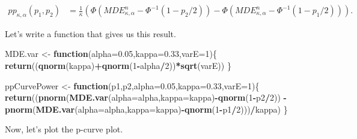 \documentclass[]{book}
\newenvironment{Shaded}{\begin{snugshade}}{\end{snugshade}}
\newcommand{\ControlFlowTok}[1]{\textcolor[rgb]{0.13,0.29,0.53}{\textbf{#1}}}
\newcommand{\DataTypeTok}[1]{\textcolor[rgb]{0.13,0.29,0.53}{#1}}
\newcommand{\DecValTok}[1]{\textcolor[rgb]{0.00,0.00,0.81}{#1}}
\newcommand{\FloatTok}[1]{\textcolor[rgb]{0.00,0.00,0.81}{#1}}
\newcommand{\KeywordTok}[1]{\textcolor[rgb]{0.13,0.29,0.53}{\textbf{#1}}}
\newcommand{\NormalTok}[1]{#1}
\newcommand{\OperatorTok}[1]{\textcolor[rgb]{0.81,0.36,0.00}{\textbf{#1}}}
\newcommand{\StringTok}[1]{\textcolor[rgb]{0.31,0.60,0.02}{#1}}
\theoremstyle{definition}
\theoremstyle{definition}
\theoremstyle{definition}
\theoremstyle{remark}
\begin{document}
\begin{align*}
  pp_{\kappa,\alpha}(p_1,p_2) & = \frac{1}{\kappa}\left(\Phi(MDE^n_{\kappa,\alpha}-\Phi^{-1}(1-p_2/2))-\Phi(MDE^n_{\kappa,\alpha}-\Phi^{-1}(1-p_1/2))\right).
\end{align*}

Let's write a function that gives us this result.

\begin{Shaded}
\begin{Highlighting}[]
\NormalTok{MDE.var <-}\StringTok{ }\ControlFlowTok{function}\NormalTok{(}\DataTypeTok{alpha=}\FloatTok{0.05}\NormalTok{,}\DataTypeTok{kappa=}\FloatTok{0.33}\NormalTok{,}\DataTypeTok{varE=}\DecValTok{1}\NormalTok{)\{}
  \KeywordTok{return}\NormalTok{((}\KeywordTok{qnorm}\NormalTok{(kappa)}\OperatorTok{+}\KeywordTok{qnorm}\NormalTok{(}\DecValTok{1}\OperatorTok{-}\NormalTok{alpha}\OperatorTok{/}\DecValTok{2}\NormalTok{))}\OperatorTok{*}\KeywordTok{sqrt}\NormalTok{(varE))}
\NormalTok{\}}

\NormalTok{ppCurvePower <-}\StringTok{ }\ControlFlowTok{function}\NormalTok{(p1,p2,}\DataTypeTok{alpha=}\FloatTok{0.05}\NormalTok{,}\DataTypeTok{kappa=}\FloatTok{0.33}\NormalTok{,}\DataTypeTok{varE=}\DecValTok{1}\NormalTok{)\{}
  \KeywordTok{return}\NormalTok{((}\KeywordTok{pnorm}\NormalTok{(}\KeywordTok{MDE.var}\NormalTok{(}\DataTypeTok{alpha=}\NormalTok{alpha,}\DataTypeTok{kappa=}\NormalTok{kappa)}\OperatorTok{-}\KeywordTok{qnorm}\NormalTok{(}\DecValTok{1}\OperatorTok{-}\NormalTok{p2}\OperatorTok{/}\DecValTok{2}\NormalTok{))}
          \OperatorTok{-}\KeywordTok{pnorm}\NormalTok{(}\KeywordTok{MDE.var}\NormalTok{(}\DataTypeTok{alpha=}\NormalTok{alpha,}\DataTypeTok{kappa=}\NormalTok{kappa)}\OperatorTok{-}\KeywordTok{qnorm}\NormalTok{(}\DecValTok{1}\OperatorTok{-}\NormalTok{p1}\OperatorTok{/}\DecValTok{2}\NormalTok{)))}\OperatorTok{/}\NormalTok{kappa)}
\NormalTok{\}}
\end{Highlighting}
\end{Shaded}

Now, let's plot the p-curve plot.
\end{document}
